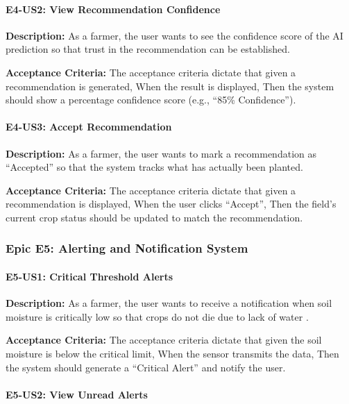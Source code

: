 \paragraph{E4-US2: View Recommendation Confidence}

\textbf{Description:} As a farmer, the user wants to see the 
confidence score of the AI prediction so that trust in the 
recommendation can be established.

\textbf{Acceptance Criteria:} The acceptance criteria dictate that given a recommendation is generated, When the result is displayed, Then the system should show a percentage confidence score (e.g., ``85\% Confidence'').


\paragraph{E4-US3: Accept Recommendation}

\textbf{Description:} As a farmer, the user wants to mark a 
recommendation as ``Accepted'' so that the system tracks what has 
actually been planted.

\textbf{Acceptance Criteria:} The acceptance criteria dictate that given a recommendation is displayed, When the user clicks ``Accept'', Then the field's current crop status should be updated to match the recommendation.


\subsubsection{Epic E5: Alerting and Notification System}

\paragraph{E5-US1: Critical Threshold Alerts}

\textbf{Description:} As a farmer, the user wants to receive a 
notification when soil moisture is critically low so that crops do 
not die due to lack of water \cite{khawas2018firebase}.

\textbf{Acceptance Criteria:} The acceptance criteria dictate that given the soil moisture is below the critical limit, When the sensor transmits the data, Then the system should generate a ``Critical Alert'' and notify the user.


\paragraph{E5-US2: View Unread Alerts}

